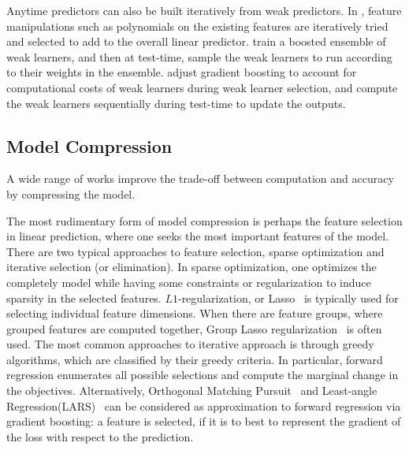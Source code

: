  
Anytime predictors can also be built iteratively from weak predictors. 
In \citep{weinberger09feature,xu:12,xu:13b}, feature manipulations such as polynomials on the existing features 
are iteratively tried and selected to add to the overall linear predictor.
\citep{reyzin:11} train a boosted ensemble of weak learners, and then at test-time, sample the weak learners
to run according to their weights in the ensemble. 
\citep{speedboost} adjust gradient boosting to account for computational costs of weak learners during weak learner 
selection, and compute the weak learners sequentially during test-time to update the outputs. 



\subsection{Model Compression}
A wide range of works improve the trade-off between computation and accuracy by compressing the model.

The most rudimentary form of model compression is perhaps the feature selection in linear prediction, where 
one seeks the most important features of the model. There are two 
typical approaches to feature selection, sparse optimization and iterative selection (or elimination). 
In sparse optimization, one optimizes the completely model while having some constraints or regularization 
to induce sparsity in the selected features. $L1$-regularization, or Lasso~\citep{lasso} is typically used 
for selecting individual feature dimensions. When there are feature groups, where grouped features are computed
together, Group Lasso regularization~\citep{group_lasso} is often used. 
The most common approaches to iterative approach is through greedy algorithms, which are classified by
their greedy criteria. In particular, forward regression enumerates all possible selections and compute the 
marginal change in the objectives. 
Alternatively, Orthogonal Matching Pursuit~\citep{omp} and Least-angle Regression(LARS)~\citep{lars}
can be considered as approximation to forward regression via gradient boosting: a feature is selected, if it is to best to
represent the gradient of the loss with respect to the prediction. 


